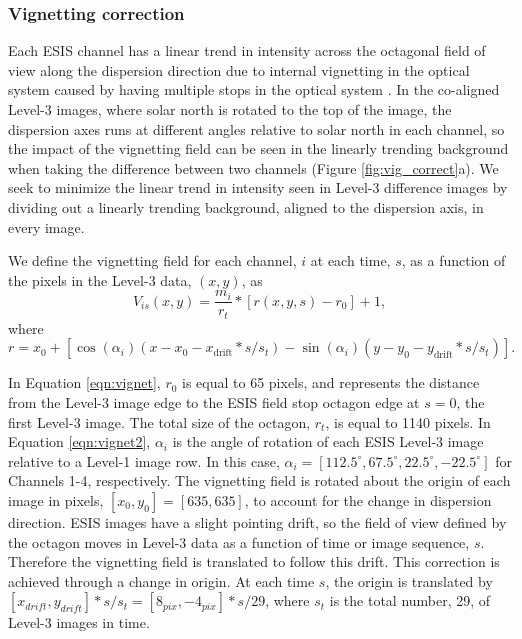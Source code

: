 \subsubsection{Vignetting correction}
  
Each ESIS channel has a linear trend in intensity across the octagonal field of view along the dispersion direction due to internal vignetting in the optical system caused by having multiple stops in the optical system \citep{ESIS}.
In the co-aligned Level-3 images, where solar north is rotated to the top of the image, the dispersion axes runs at different angles relative to solar north in each channel, so the impact of the vignetting field can be seen in the linearly trending background when taking the difference between two channels (Figure \ref{fig:vig_correct}a).
We seek to minimize the linear trend in intensity seen in Level-3 difference images by dividing out a linearly trending background, aligned to the dispersion axis, in every image.

We define the vignetting field for each channel, $i$ at each time, $s$, as a function of the pixels in the Level-3 data, $(x,y)$, as 
	\begin{equation}
		V_{is}(x,y) = \frac{m_i}{r_t} * [r(x,y,s) - r_0] + 1,
		\label{eqn:vignet}
	\end{equation}
where
	\begin{equation}
		r = x_0 + [\cos(\alpha_i)(x-x_0-x_{\text{drift}}*s/s_t) - \sin(\alpha_i)(y-y_0-y_{\text{drift}}*s/s_t)].
		\label{eqn:vignet2}
	\end{equation}

In Equation \ref{eqn:vignet}, $r_0$ is equal to 65 pixels, and represents the distance from the Level-3 image edge to the ESIS field stop octagon edge at $s = 0$, the first Level-3 image.
The total size of the octagon, $r_t$, is equal to 1140 pixels.
In Equation \ref{eqn:vignet2},  $\alpha_i$ is the angle of rotation of each ESIS Level-3 image relative to a Level-1 image row.
In this case, $\alpha_i = [112.5^{\circ}, 67.5^{\circ}, 22.5^{\circ}, -22.5^{\circ}]$ for Channels 1-4, respectively.
The vignetting field is rotated about the origin of each image in pixels, $[x_0, y_0] = [635,635]$, to account for the change in dispersion direction.
ESIS images have a slight pointing drift, so the field of view defined by the octagon moves in Level-3 data as a function of time or image sequence, $s$.
Therefore the vignetting field is translated to follow this drift.
This correction is achieved through a change in origin.
At each time $s$, the origin is translated by $[x_{drift},y_{drift}]*s/s_t = [8_{pix},-4_{pix}]*s/29$, where $s_t $ is the total number, 29, of Level-3 images in time. 

